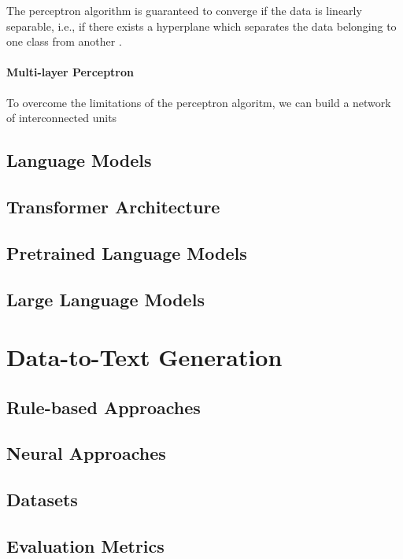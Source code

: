 The perceptron algorithm is guaranteed to converge if the data is linearly separable, i.e., if there exists a hyperplane which separates the data belonging to one class from another \cite{novikoff1962convergence}.

\paragraph{Multi-layer Perceptron} To overcome the limitations of the perceptron algoritm, we can build a network of interconnected units

\subsection{Language Models}
\label{sec:lm-basics}
\subsection{Transformer Architecture}
\label{sec:transformer}
\subsection{Pretrained Language Models}
\label{sec:plms}
\subsection{Large Language Models}
\label{sec:llms}
\section{Data-to-Text Generation}
\label{sec:d2t}
\subsection{Rule-based Approaches}
\label{sec:rule-d2t}
\subsection{Neural Approaches}
\label{sec:neural-d2t}
\subsection{Datasets}
\label{sec:datasets}
\subsection{Evaluation Metrics}
\label{sec:evaluation}